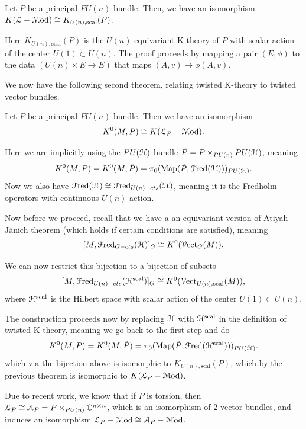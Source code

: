 \documentclass[10pt]{amsart}
\begin{document}
	\begin{theorem}
		Let $P$ be a principal $PU(n)$-bundle. Then, we have an isomorphism $K(\mathcal{L}-\mathcal{M}\mathrm{od}) \cong K_{U(n), \mathrm{scal}}(P)$.
	\end{theorem}

	Here $K_{U(n), \mathrm{scal}}(P)$ is the $U(n)$-equivariant K-theory of $P$ with scalar action of the center $U(1) \subset U(n)$. The proof proceeds by mapping a pair $(E,\phi)$ to the data $(U(n) \times E \to E)$ that maps $(A,v) \mapsto \phi(A,v)$.

	We now have the following second theorem, relating twisted K-theory to twisted vector bundles.

	\begin{theorem}
	 Let $P$ be a principal $PU(n)$-bundle. Then we have an isomorphism
	 \[ K^0(M,P) \cong K(\mathcal{L}_P-\mathcal{M}\mathrm{od}). \]
	\end{theorem}

	Here we are implicitly using the $PU(\mathcal{H})$-bundle $\tilde{P} = P \times_{PU(n)} PU(\mathcal{H})$, meaning 
	\[K^0(M,P) = K^0(M,\tilde{P}) = \pi_0(\mathrm{Map}(\tilde{P}, \mathcal{F}\mathrm{red}(\mathcal{H})))_{PU(\mathcal{H})}.\] 
Now we also have $\mathcal{F}\mathrm{red}(\mathcal{H})	\cong \mathcal{F}\mathrm{red}_{U(n)-cts}(\mathcal{H})$, meaning it is the Fredholm operators with continuous $U(n)$-action.

Now before we proceed, recall that we have a an equivariant version of Atiyah-J\"anich theorem (which holds if certain conditions are satisfied), meaning 
\[ [M,\mathcal{F}\mathrm{red}_{G-cts}(\mathcal{H})]_G \cong K^0(\mathcal{V}\mathrm{ect}_G(M)). \]

We can now restrict this bijection to a bijection of subsets 
\[[M,\mathcal{F}\mathrm{red}_{U(n)-cts}(\mathcal{H}^{\mathrm{scal}})]_G \cong K^0(\mathcal{V}\mathrm{ect}_{U(n),\mathrm{scal}}(M)), \]
where $\mathcal{H}^{\mathrm{scal}}$ is the Hilbert space with scalar action of the center $U(1) \subset U(n)$. 

The construction proceeds now by replacing $\mathcal{H}$ with $\mathcal{H}^{\mathrm{scal}}$ in the definition of twisted K-theory, meaning we go back to the first step and do 
	\[K^0(M,P) = K^0(M,\tilde{P}) = \pi_0(\mathrm{Map}(\tilde{P}, \mathcal{F}\mathrm{red}(\mathcal{H}^{\mathrm{scal}})))_{PU(\mathcal{H})}.\]
	which via the bijection above is isomorphic to $K_{U(n),\mathrm{scal}}(P)$, which by the previous theorem is isomorphic to $K(\mathcal{L}_P-\mathcal{M}\mathrm{od})$. 

\begin{remark}
	Due to recent work, we know that if $P$ is torsion, then $\mathcal{L}_P \cong \mathcal{A}_P = P \times_{PU(n)}\mathbb{C}^{n \times n}$, which is an isomorphism of $2$-vector bundles, and induces an isomorphism $\mathcal{L}_P-\mathcal{M}\mathrm{od} \cong \mathcal{A}_P-\mathcal{M}\mathrm{od}$.
\end{remark}
\end{document}
